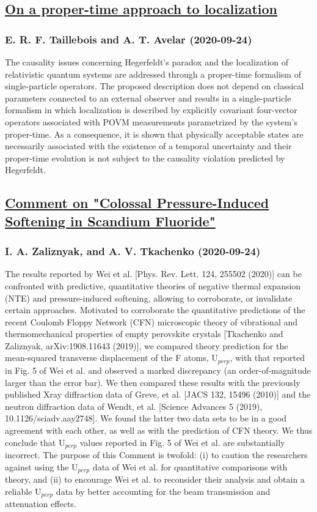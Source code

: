 \subsection*{\href{http://arxiv.org/abs/2009.13068v1}{On a proper-time approach to localization}}
\subsubsection*{E. R. F. Taillebois and A. T. Avelar (2020-09-24)}
The causality issues concerning Hegerfeldt's paradox and the localization of
relativistic quantum systems are addressed through a proper-time formalism of
single-particle operators. The proposed description does not depend on
classical parameters connected to an external observer and results in a
single-particle formalism in which localization is described by explicitly
covariant four-vector operators associated with POVM measurements parametrized
by the system's proper-time. As a consequence, it is shown that physically
acceptable states are necessarily associated with the existence of a temporal
uncertainty and their proper-time evolution is not subject to the causality
violation predicted by Hegerfeldt.

\subsection*{\href{http://arxiv.org/abs/2009.11922v1}{Comment on "Colossal Pressure-Induced Softening in Scandium Fluoride"}}
\subsubsection*{I. A. Zaliznyak, and A. V. Tkachenko (2020-09-24)}
The results reported by Wei et al. [Phys. Rev. Lett. 124, 255502 (2020)] can
be confronted with predictive, quantitative theories of negative thermal
expansion (NTE) and pressure-induced softening, allowing to corroborate, or
invalidate certain approaches. Motivated to corroborate the quantitative
predictions of the recent Coulomb Floppy Network (CFN) microscopic theory of
vibrational and thermomechanical properties of empty perovskite crystals
[Tkachenko and Zaliznyak, arXiv:1908.11643 (2019)], we compared theory
prediction for the mean-squared transverse displacement of the F atoms,
U$_{perp}$, with that reported in Fig. 5 of Wei et al. and observed a marked
discrepancy (an order-of-magnitude larger than the error bar). We then compared
these results with the previously published Xray diffraction data of Greve, et
al. [JACS 132, 15496 (2010)] and the neutron diffraction data of Wendt, et al.
[Science Advances 5 (2019), 10.1126/sciadv.aay2748]. We found the latter two
data sets to be in a good agreement with each other, as well as with the
prediction of CFN theory. We thus conclude that U$_{perp}$ values reported in
Fig. 5 of Wei et al. are substantially incorrect. The purpose of this Comment
is twofold: (i) to caution the researchers against using the U$_{perp}$ data of
Wei et al. for quantitative comparisons with theory, and (ii) to encourage Wei
et al. to reconsider their analysis and obtain a reliable U$_{perp}$ data by
better accounting for the beam transmission and attenuation effects.

